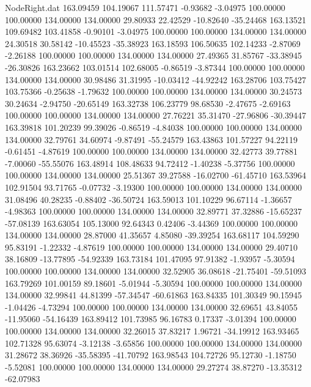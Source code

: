 \begin{filecontents}{NodeRight.dat}
 163.09459  104.19067  111.57471    -0.93682   -3.04975  100.00000  100.00000  134.00000  134.00000   29.80933   22.42529  -10.82640  -35.24468
 163.13521  109.69482  103.41858    -0.90101   -3.04975  100.00000  100.00000  134.00000  134.00000   24.30518   30.58142  -10.45523  -35.38923
 163.18593  106.50635  102.14233    -2.87069   -2.26188  100.00000  100.00000  134.00000  134.00000   27.49365   31.85767  -33.38945  -26.30826
 163.23662  103.01514  102.68005    -0.86519   -3.87344  100.00000  100.00000  134.00000  134.00000   30.98486   31.31995  -10.03412  -44.92242
 163.28706  103.75427  103.75366    -0.25638   -1.79632  100.00000  100.00000  134.00000  134.00000   30.24573   30.24634   -2.94750  -20.65149
 163.32738  106.23779   98.68530    -2.47675   -2.69163  100.00000  100.00000  134.00000  134.00000   27.76221   35.31470  -27.96806  -30.39447
 163.39818  101.20239   99.39026    -0.86519   -4.84038  100.00000  100.00000  134.00000  134.00000   32.79761   34.60974   -9.87491  -55.24579
 163.43863  101.57227   94.22119    -0.61451   -4.87619  100.00000  100.00000  134.00000  134.00000   32.42773   39.77881   -7.00060  -55.55076
 163.48914  108.48633   94.72412    -1.40238   -5.37756  100.00000  100.00000  134.00000  134.00000   25.51367   39.27588  -16.02700  -61.45710
 163.53964  102.91504   93.71765    -0.07732   -3.19300  100.00000  100.00000  134.00000  134.00000   31.08496   40.28235   -0.88402  -36.50724
 163.59013  101.10229   96.67114    -1.36657   -4.98363  100.00000  100.00000  134.00000  134.00000   32.89771   37.32886  -15.65237  -57.08139
 163.63054  105.13000   92.64343     0.42406   -3.44369  100.00000  100.00000  134.00000  134.00000   28.87000   41.35657    4.85080  -39.39254
 163.68117  104.59290   95.83191    -1.22332   -4.87619  100.00000  100.00000  134.00000  134.00000   29.40710   38.16809  -13.77895  -54.92339
 163.73184  101.47095   97.91382    -1.93957   -5.30594  100.00000  100.00000  134.00000  134.00000   32.52905   36.08618  -21.75401  -59.51093
 163.79269  101.00159   89.18601    -5.01944   -5.30594  100.00000  100.00000  134.00000  134.00000   32.99841   44.81399  -57.34547  -60.61863
 163.84335  101.30349   90.15945    -1.04426   -4.73294  100.00000  100.00000  134.00000  134.00000   32.69651   43.84055  -11.95060  -54.16439
 163.89412  101.73985   96.16783     0.17337   -3.01394  100.00000  100.00000  134.00000  134.00000   32.26015   37.83217    1.96721  -34.19912
 163.93465  102.71328   95.63074    -3.12138   -3.65856  100.00000  100.00000  134.00000  134.00000   31.28672   38.36926  -35.58395  -41.70792
 163.98543  104.72726   95.12730    -1.18750   -5.52081  100.00000  100.00000  134.00000  134.00000   29.27274   38.87270  -13.35312  -62.07983

\end{filecontents}
